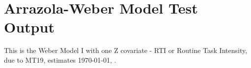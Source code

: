 \documentclass{article}
\begin{document}
\section*{Arrazola-Weber Model Test Output}

This is the Weber Model I with one Z covariate - RTI or Routine Task Intensity, due to MT19,
estimates \today, \currenttime. 
\end{document}
